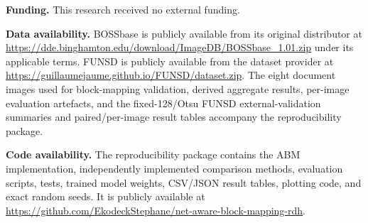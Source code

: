 \documentclass[a4paper,fleqn]{cas-dc}
\newcommand{\RevisionAddBegin}{\begingroup}
\newcommand{\RevisionAddEnd}{\endgroup}
\newcommand{\RevisionAddBegin}{\begingroup\color{revisionblue}}
\newcommand{\RevisionAddEnd}{\endgroup}
\begin{document}
\medskip
\noindent\textbf{Funding.}
This research received no external funding.

\medskip
\noindent\textbf{Data availability.}
\RevisionAddBegin
BOSSbase is publicly available from its original distributor at
\url{https://dde.binghamton.edu/download/ImageDB/BOSSbase_1.01.zip} under its
applicable terms. FUNSD is publicly available from the dataset provider at
\url{https://guillaumejaume.github.io/FUNSD/dataset.zip}. The eight document
images used for block-mapping validation, derived aggregate results, per-image
evaluation artefacts, and the fixed-128/Otsu FUNSD external-validation
summaries and paired/per-image result tables accompany the reproducibility
package.
\RevisionAddEnd

\medskip
\noindent\textbf{Code availability.}
The reproducibility package contains the ABM implementation, independently
implemented comparison methods, evaluation scripts, tests, trained model
weights, CSV/JSON result tables, plotting code, and exact random seeds. It is
publicly available at
\url{https://github.com/EkodeckStephane/net-aware-block-mapping-rdh}.



\end{document}
